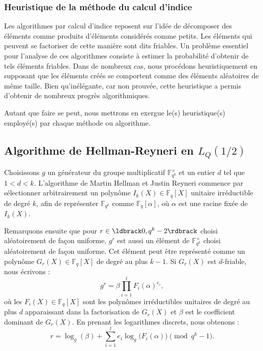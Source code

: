 \documentclass[a4paper, titlepage, 11pt]{article}
\theoremstyle{definition}
\theoremstyle{remark}
\def\gf #1{\mathbb{F}_{#1}}
\begin{document}
\subsubsection{Heuristique de la méthode du calcul d'indice}

Les algorithmes par calcul d'indice reposent sur l'idée de décomposer des éléments comme produits d'éléments considérés comme \og{}petits\fg{}. Les éléments qui peuvent se factoriser de cette manière sont dits friables. Un problème essentiel pour l'analyse de ces algorithmes consiste à estimer la probabilité d'obtenir de tels éléments friables. Dans de nombreux cas, nous procédons heuristiquement en supposant que les éléments créés se comportent comme des éléments aléatoires de même taille. Bien qu'inélégante, car non prouvée, cette heuristique a permis d'obtenir de nombreux progrès algorithmiques.

Autant que faire se peut, nous mettrons en exergue le(s) heuristique(s) employé(s) par chaque méthode ou algorithme.

\subsection{Algorithme de Hellman-Reyneri en $L_{Q}(1/2)$}

Choisissons $g$ un générateur du groupe multiplicatif $\gf{q^k}^\times$ et un entier $d$ tel que $1 < d < k$. L'algorithme de Martin Hellman et Justin Reyneri \cite{hellman1982} commence par sélectionner arbitrairement un polynôme $I_k(X) \in \gf{q}[X]$ unitaire irréductible de degré $k$, afin de représenter $\gf{q^k}$ comme $\gf{q}[\alpha]$, où $\alpha$ est une racine fixée de $I_k(X)$.

Remarquons ensuite que pour $r \in \ldbrack 0, q^k - 2 \rdbrack$ choisi aléatoirement de façon uniforme, $g^r$ est aussi un élément de $\gf{q^k}^\times$ choisi aléatoirement de façon uniforme. Cet élément peut être représenté comme un polynôme $G_r(X) \in \gf{q}[X]$ de degré au plus $k-1$. Si $G_r(X)$ est $d$-friable, nous écrivons :
$$g^r = \beta \prod_{i=1}^{t} F_i(\alpha)^{e_i},$$
où les $F_i(X)\in \gf{q}[X]$ sont les polynômes irréductibles unitaires de degré au plus $d$ apparaissant dans la factorisation de $G_r(X)$ et $\beta$ est le coefficient dominant de $G_r(X)$. En prenant les logarithmes discrets, nous obtenons :
\begin{equation}\label{eqn:hellman-reyneri}
r = \log_g(\beta) + \sum_{i=1}^t e_i\log_g\big(F_i(\alpha)\big) \pmod{q^k - 1}.
\end{equation}
\end{document}
